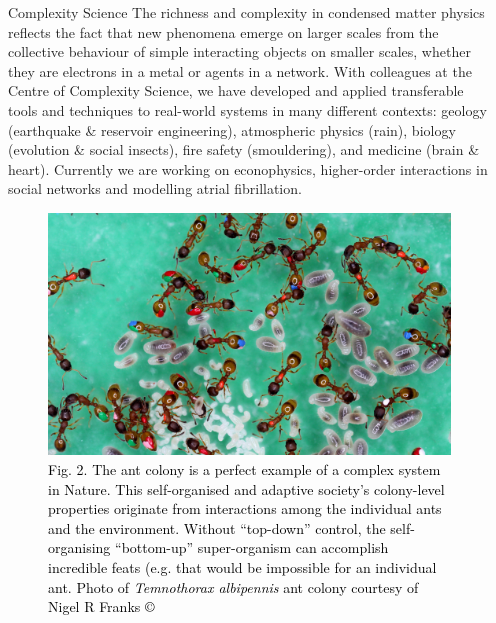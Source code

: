 \documentclass[xcolor={table}]{beamer}
\begin{document}
\begin{frame}[fragile=singleslide,t]
\begin{columns}[onlytextwidth,T]
\begin{column}{.47\textwidth}
\begin{block}{Complexity Science}
The richness and complexity in condensed matter physics reflects the fact that
new phenomena emerge on larger scales from the collective behaviour of simple
interacting objects on smaller scales, whether they are electrons in a metal or agents in a network. With colleagues at the Centre of Complexity Science, we have developed and applied transferable tools and techniques to real-world systems in many different contexts: geology (earthquake \& reservoir
engineering), atmospheric physics (rain), biology (evolution \& social insects), fire safety (smouldering), and medicine (brain \& heart). Currently we are working on econophysics, higher-order interactions in social networks and modelling atrial fibrillation.
\end{block}
\vspace*{-1.5cm}
\begin{figure}
    \centering
    \includegraphics[width=0.9\columnwidth]{Temnothorax-albipennis-copyright-Nigel-R-Franks.jpg}
    \caption{\footnotesize \textcolor{black}{Fig. 2. The ant colony is a perfect example of a complex system in Nature. This self-organised and adaptive society's colony-level properties originate from interactions among the individual ants and the environment. Without ``top-down'' control, the self-organising ``bottom-up'' super-organism can accomplish incredible feats (e.g. that would be impossible for an individual ant. Photo of {\it \footnotesize  Temnothorax albipennis} ant colony courtesy of Nigel R Franks $\copyright$}}
\end{figure}

\end{column}

\begin{column}{.47\textwidth}


\end{column}
\end{columns}
\end{frame}
\end{document}
